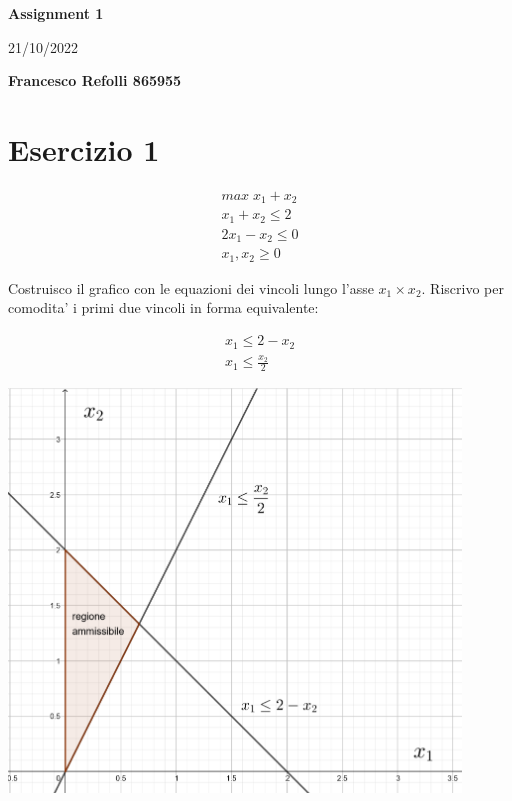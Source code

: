 \documentclass[a4paper,12pt,oneside]{article}
\begin{document}
    \thispagestyle{plain}
    \begin{center}
        \normalsize
        \textbf{Assignment 1}
            
        \vspace{0.2cm}
        \normalsize
        21/10/2022
            
        \vspace{0.2cm}
        \textbf{Francesco Refolli 865955}
    \end{center}

    \section{Esercizio 1}

    \begin{align}
        \text{$max \; x_1 + x_2$} \\
        \text{$x_1 + x_2 \leq 2$} \\
        \text{$2 x_1 - x_2 \leq 0$} \\
        \text{$x_1, x_2 \geq 0$}
    \end{align}

    Costruisco il grafico con le equazioni dei vincoli lungo l'asse $x_1 \times x_2$.
    Riscrivo per comodita' i primi due vincoli in forma equivalente:

    \begin{align}
        \text{$x_1 \leq 2 - x_2$} \\
        \text{$x_1 \leq \frac {x_2} 2$}
    \end{align}

    \begin{center}
        \includegraphics[width=12cm]{prima-fase.png}
    \end{center}
\end{document}
